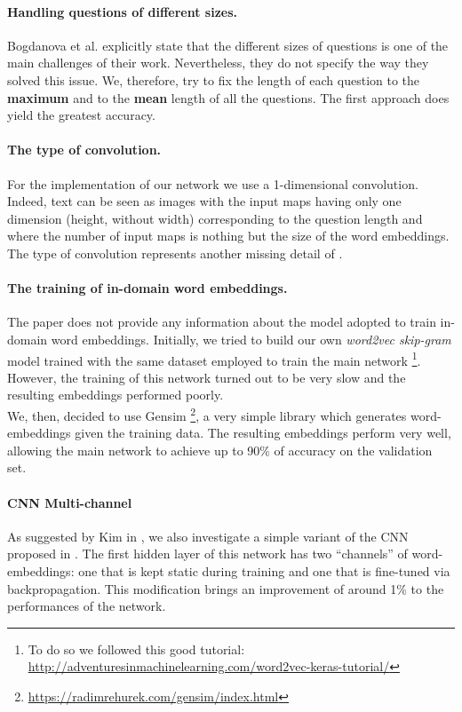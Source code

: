 \documentclass[10pt,twocolumn,letterpaper]{article}
\begin{document}
    \paragraph{Handling questions of different sizes.}
    Bogdanova et al. explicitly state that the different sizes of questions is one of the main challenges of their work. Nevertheless, they do not specify the way they solved this issue. We, therefore, try to fix the length of each question to the \textbf{maximum} and to the \textbf{mean} length of all the questions. The first approach does yield the greatest accuracy.
    \paragraph{The type of convolution.}
    For the implementation of our network we use a 1-dimensional convolution. Indeed, text can be seen as images with the input maps having only one dimension (height, without width) corresponding to the question length and where the number of input maps is nothing but the size of the word embeddings. The type of convolution represents another missing detail of \cite{bogdanova2015detecting}.    
    \paragraph{The training of in-domain word embeddings.}
    The paper \cite{bogdanova2015detecting} does not provide any information about the model adopted to train in-domain word embeddings. Initially, we tried to build our own \emph{word2vec skip-gram} model \cite{mikolov2013distributed} trained with the same dataset employed to train the main network \footnote{To do so we followed this good tutorial: \url{http://adventuresinmachinelearning.com/word2vec-keras-tutorial/}}. However, the training of this network turned out to be very slow and the resulting embeddings performed poorly. \\
    We, then, decided to use Gensim \footnote{\url{https://radimrehurek.com/gensim/index.html}}, a very simple library which generates word-embeddings given the training data. The resulting embeddings perform very well, allowing the main network to achieve up to 90\% of accuracy on the validation set.
    	\paragraph{CNN Multi-channel}
    	As suggested by Kim in \cite{kim2014convolutional}, we also investigate a simple variant of the CNN proposed in \cite{bogdanova2015detecting}. The first hidden layer of this network has two ``channels'' of word-embeddings: one that is kept static during training and one that is fine-tuned via backpropagation. This modification brings an improvement of around 1\% to the performances of the network.  
\end{document}
